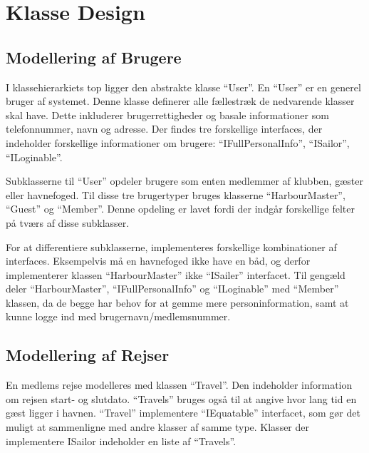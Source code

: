\section{Klasse Design}
\label{sec:klasse_design}


\label{sub:uml_diagram}

\subsection{Modellering af Brugere}
\label{sub:brugere_af_programmet}

I klassehierarkiets top ligger den abstrakte klasse \enquote{User}. En \enquote{User} er en generel bruger af systemet. Denne klasse definerer alle fællestræk de nedvarende klasser skal have. Dette inkluderer brugerrettigheder og basale informationer som telefonnummer, navn og adresse. Der findes tre forskellige interfaces, der indeholder forskellige informationer om brugere: \enquote{IFullPersonalInfo}, \enquote{ISailor}, \enquote{ILoginable}.

Subklasserne til \enquote{User} opdeler brugere som enten medlemmer af klubben, gæster eller havnefoged. Til disse tre brugertyper bruges klasserne \enquote{HarbourMaster}, \enquote{Guest} og \enquote{Member}. Denne opdeling er lavet fordi der indgår forskellige felter på tværs af disse subklasser. 

For at differentiere subklasserne, implementeres forskellige kombinationer af interfaces. Eksempelvis må en havnefoged ikke have en båd, og derfor implementerer klassen \enquote{HarbourMaster} ikke \enquote{ISailer} interfacet. Til gengæld deler \enquote{HarbourMaster}, \enquote{IFullPersonalInfo} og \enquote{ILoginable} med \enquote{Member} klassen, da de begge har behov for at gemme mere personinformation, samt at kunne logge ind med brugernavn/medlemsnummer.

\subsection{Modellering af Rejser}
\label{sub:rejser}

En medlems rejse modelleres med klassen \enquote{Travel}. Den indeholder information om rejsen start- og slutdato. \enquote{Travels} bruges også til at angive hvor lang tid en gæst ligger i havnen. \enquote{Travel} implementere \enquote{IEquatable} interfacet, som gør det muligt at sammenligne med andre klasser af samme type. Klasser der implementere ISailor indeholder en liste af \enquote{Travels}.

